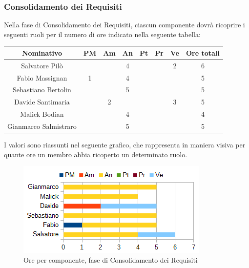 		\subsubsection{Consolidamento dei Requisiti}
		Nella fase di Consolidamento dei Requisiti, ciascun componente dovrà ricoprire i seguenti ruoli per il numero di ore indicato nella seguente tabella: \\
		\begin{table}[H]
		\centering
		\begin{tabular}{|c|c|c|c|c|c|c|c|}
			\hline
			\textbf{Nominativo}		& \textbf{PM}	& \textbf{Am}	& \textbf{An}	& \textbf{Pt}	& \textbf{Pr}	& \textbf{Ve}	& \textbf{Ore totali}     \\
			\hline
			Salvatore Pilò			&		& 		& 4		&		&		& 2		& 6 \\
			Fabio Massignan			& 1		& 		& 4		&		&		& 		& 5 \\
			Sebastiano Bertolin		&		& 		& 5		&		&		&		& 5 \\
			Davide Santimaria		&		& 2		&		&		&		& 3		& 5 \\
			Malick Bodian			& 		& 		& 4		&		&		& 		& 4 \\
			Gianmarco Salmistraro	&		& 		& 5		&		&		& 		& 5 \\
			\hline
		\end{tabular}
		\end{table}
		I valori sono riassunti nel seguente grafico, che rappresenta in maniera visiva per quante ore un membro abbia ricoperto un determinato ruolo. \\
		\begin{figure}[H]
			\centering
			\includegraphics[width=1\linewidth]{immagini/grafici/analisi_dettaglio-barra.png}
			\caption{Ore per componente, fase di Consolidamento dei Requisiti}
		\end{figure}
